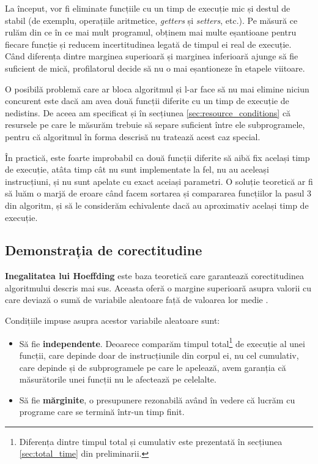 La început, vor fi eliminate funcțiile cu un timp de execuție mic și destul de stabil (de exemplu, operațiile aritmetice, \textit{getters} și \textit{setters}, etc.). Pe măsură ce rulăm din ce în ce mai mult programul, obținem mai multe eșantioane pentru fiecare funcție și reducem incertitudinea legată de timpul ei real de execuție. Când diferența dintre marginea superioară și marginea inferioară ajunge să fie suficient de mică, profilatorul decide să nu o mai eșantioneze în etapele viitoare.

O posibilă problemă care ar bloca algoritmul și l-ar face să nu mai elimine niciun concurent este dacă am avea două funcții diferite cu un timp de execuție de nedistins. De aceea am specificat și în secțiunea \ref{sec:resource_conditions} că resursele pe care le măsurăm trebuie să separe suficient între ele subprogramele, pentru că algoritmul în forma descrisă nu tratează acest caz special.

În practică, este foarte improbabil ca două funcții diferite să aibă fix același timp de execuție, atâta timp cât nu sunt implementate la fel, nu au aceleași instrucțiuni, și nu sunt apelate cu exact aceiași parametri. O soluție teoretică ar fi să luăm o marjă de eroare când facem sortarea și compararea funcțiilor la pasul 3 din algoritm, și să le considerăm echivalente dacă au aproximativ același timp de execuție.

\subsection{Demonstrația de corectitudine}

\textbf{Inegalitatea lui Hoeffding} este baza teoretică care garantează corectitudinea algoritmului descris mai sus. Aceasta oferă o margine superioară asupra valorii cu care deviază o sumă de variabile aleatoare față de valoarea lor medie \cite{hoeffding_inequality}.

Condițiile impuse asupra acestor variabile aleatoare sunt:
\begin{itemize}
    \item Să fie \textbf{independente}. Deoarece comparăm timpul total\footnote{Diferența dintre timpul total și cumulativ este prezentată în secțiunea \ref{sec:total_time} din preliminarii.} de execuție al unei funcții, care depinde doar de instrucțiunile din corpul ei, nu cel cumulativ, care depinde și de subprogramele pe care le apelează, avem garanția că măsurătorile unei funcții nu le afectează pe celelalte.
    \item Să fie \textbf{mărginite}, o presupunere rezonabilă având în vedere că lucrăm cu programe care se termină într-un timp finit.
\end{itemize}

